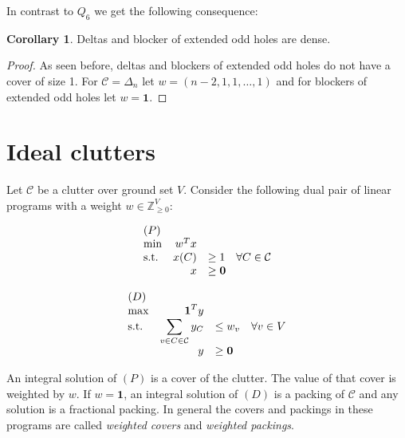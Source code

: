 \documentclass[a4paper, 12pt, twoside=false]{scrbook}
\theoremstyle{definition}
\newtheorem{corollary}[theorem]{Corollary}
\newcommand*{\IZ}{\ensuremath{\mathbb{Z}}}
\begin{document}
In contrast to $Q_6$ we get the following consequence:
\begin{corollary}
    Deltas and blocker of extended odd holes are dense.
\end{corollary}

\begin{proof}
    As seen before, deltas and blockers of extended odd holes do not have a cover of size 1.
    For $\mathcal{C}=\Delta_n$ let $w=(n-2,1,1,\ldots,1)$ and for blockers of extended odd holes let $w=\textbf{1}$.
\end{proof}

\section{Ideal clutters}
Let $\mathcal{C}$ be a clutter over ground set $V$. Consider the following dual pair of linear programs with a weight $w \in \IZ^V_{\geq 0}$:
\newline
\newline
    \begin{minipage}{.5\linewidth}
        \begin{equation*}
            \begin{array}{l@{\quad} r l l}
                (P)\\
                \min          &w^Tx   \\
                \mathrm{s.t.}  &x(C) &\geq  1 \quad \forall C \in \mathcal{C} \\
                    &   x &\geq   \textbf{0}
            \end{array}
        \end{equation*}
    \end{minipage}
    \begin{minipage}{.5\linewidth}
        \begin{equation*}
            \begin{array}{l@{\quad} r l l}
                (D)\\
                \max          &\textbf{1}^Ty   \\
                \mathrm{s.t.}  &\displaystyle\sum\limits_{v \in C \in \mathcal{C}} y_C &\leq  w_v \quad \forall v \in V \\
                    &   y &\geq   \textbf{0}
            \end{array}
        \end{equation*}
    \end{minipage}
   \newline
   \newline
   An integral solution of $(P)$ is a cover of the clutter. The value of that cover is weighted by $w$. If $w=\textbf{1}$, an integral solution of $(D)$ is a packing of $\mathcal{C}$ and any solution is a fractional packing.
   In general the covers and packings in these programs are called \emph{weighted covers} and \emph{weighted packings}.
\end{document}

